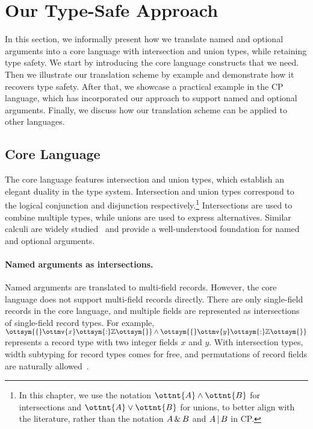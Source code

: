 \section{Our Type-Safe Approach} \label{sec:type-safe}

In this section, we informally present how we translate named and optional
arguments into a core language with intersection and union types, while
retaining type safety. We start by introducing the core language constructs that
we need. Then we illustrate our translation scheme by example and demonstrate
how it recovers type safety. After that, we showcase a practical example in the
CP language, which has incorporated our approach to support named and optional
arguments. Finally, we discuss how our translation scheme can be applied to
other languages.

\subsection{Core Language} \label{sec:core}

The core language features intersection and union types, which establish an
elegant duality in the type system. Intersection and union types correspond to
the logical conjunction and disjunction respectively.\footnote{In this chapter,
we use the notation $\ottnt{A}  \land  \ottnt{B}$ for intersections and $\ottnt{A}  \lor  \ottnt{B}$ for unions, to
better align with the literature, rather than the notation $A \,\&\, B$ and $A
\,|\, B$ in CP.} Intersections are used to combine multiple types, while unions
are used to express alternatives. Similar calculi are widely
studied~\citep{barbanera1995intersection,frisch2008semantic,dunfield2014elaborating}
and provide a well-understood foundation for named and optional arguments.

\paragraph{Named arguments as intersections.}
Named arguments are translated to multi-field records. However, the core
language does not support multi-field records directly. There are only
single-field records in the core language, and multiple fields are represented
as intersections of single-field record types. For example,
$\ottsym{\{}  \ottmv{x}  \ottsym{:}   \mathbb{Z}   \ottsym{\}}  \land  \ottsym{\{}  \ottmv{y}  \ottsym{:}   \mathbb{Z}   \ottsym{\}}$ represents a record type with two integer fields $x$ and
$y$. With intersection types, width subtyping for record types comes for free,
and permutations of record fields are naturally
allowed~\citep{reynolds1997design}.

